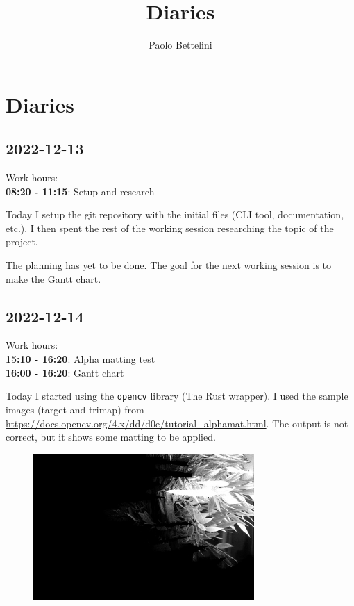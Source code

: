 \documentclass{article}
\title{Diaries}
\author{Paolo Bettelini}
\date{}
\begin{document}
\maketitle
\tableofcontents
\pagebreak

\section{Diaries}

\subsection{2022-12-13}

Work hours:\\
\textbf{08:20 - 11:15}: Setup and research

Today I setup the git repository with the initial files
(CLI tool, documentation, etc.).
I then spent the rest of the working
session researching the topic of the project.

The planning has yet to be done.
The goal for the next working session is to make the Gantt chart.

\subsection{2022-12-14}

Work hours:\\
\textbf{15:10 - 16:20}: Alpha matting test \\
\textbf{16:00 - 16:20}: Gantt chart

Today I started using the \texttt{opencv} library (The Rust wrapper).
I used the sample images (target and trimap) from \href{https://docs.opencv.org/4.x/dd/d0e/tutorial\_alphamat.html}{https://docs.opencv.org/4.x/dd/d0e/tutorial\_alphamat.html}.
The output is not correct, but it shows some matting to be applied.
\begin{figure}[h]
    \centering
    \includegraphics[width=0.75\textwidth]{res1}
\end{figure}
\end{document}
